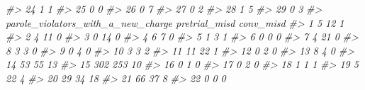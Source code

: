 \documentclass[
]{krantz}
\makeatletter
\newenvironment{Shaded}{\begin{snugshade}}{\end{snugshade}}
\newcommand{\CommentTok}[1]{\textcolor[rgb]{0.37,0.37,0.37}{\textit{#1}}}
\newenvironment{kframe}{%
\medskip{}
\setlength{\fboxsep}{.8em}
 \def\at@end@of@kframe{}%
 \ifinner\ifhmode%
  \def\at@end@of@kframe{\end{minipage}}%
  \begin{minipage}{\columnwidth}%
 \fi\fi%
 \def\FrameCommand##1{\hskip\@totalleftmargin \hskip-\fboxsep
 \colorbox{shadecolor}{##1}\hskip-\fboxsep
     \hskip-\linewidth \hskip-\@totalleftmargin \hskip\columnwidth}%
 \MakeFramed {\advance\hsize-\width
   \@totalleftmargin\z@ \linewidth\hsize
   \@setminipage}}%
 {\par\unskip\endMakeFramed%
 \at@end@of@kframe}
\renewenvironment{Shaded}{\begin{kframe}}{\end{kframe}}
\makeatother
\begin{document}
\begin{Shaded}
\begin{Highlighting}[]
\CommentTok{\#\textgreater{} 24                                        1                1}
\CommentTok{\#\textgreater{} 25                                        0                0}
\CommentTok{\#\textgreater{} 26                                        0                7}
\CommentTok{\#\textgreater{} 27                                        0                2}
\CommentTok{\#\textgreater{} 28                                        1                5}
\CommentTok{\#\textgreater{} 29                                        0                3}
\CommentTok{\#\textgreater{}    parole\_violators\_with\_a\_new\_charge pretrial\_misd conv\_misd}
\CommentTok{\#\textgreater{} 1                                   5            12         1}
\CommentTok{\#\textgreater{} 2                                   4            11         0}
\CommentTok{\#\textgreater{} 3                                   0            14         0}
\CommentTok{\#\textgreater{} 4                                   6             7         0}
\CommentTok{\#\textgreater{} 5                                   1             3         1}
\CommentTok{\#\textgreater{} 6                                   0             0         0}
\CommentTok{\#\textgreater{} 7                                   4            21         0}
\CommentTok{\#\textgreater{} 8                                   3             3         0}
\CommentTok{\#\textgreater{} 9                                   0             4         0}
\CommentTok{\#\textgreater{} 10                                  3             3         2}
\CommentTok{\#\textgreater{} 11                                 11            22         1}
\CommentTok{\#\textgreater{} 12                                  0             2         0}
\CommentTok{\#\textgreater{} 13                                  8             4         0}
\CommentTok{\#\textgreater{} 14                                 53            55        13}
\CommentTok{\#\textgreater{} 15                                302           253        10}
\CommentTok{\#\textgreater{} 16                                  0             1         0}
\CommentTok{\#\textgreater{} 17                                  0             2         0}
\CommentTok{\#\textgreater{} 18                                  1             1         1}
\CommentTok{\#\textgreater{} 19                                  5            22         4}
\CommentTok{\#\textgreater{} 20                                 29            34        18}
\CommentTok{\#\textgreater{} 21                                 66            37         8}
\CommentTok{\#\textgreater{} 22                                  0             0         0}

\end{Highlighting}
\end{Shaded}
\end{document}
